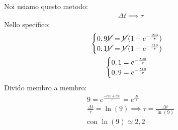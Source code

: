 \documentclass[a4paper, oneside]{article}
\begin{document}
Noi usiamo questo metodo:
\begin{gather*}
    \Delta t \implies \tau
\end{gather*}
Nello specifico:
\begin{gather*}
\begin{cases}
        0,9 \cancel{V} = \cancel{V} ( 1 - e^{-\frac{t 90}{\tau}})\\
        0,1 \cancel{V} = \cancel{V} ( 1 - e^{-\frac{t 10}{\tau}})
\end{cases}\\
\begin{cases}
    0,1 =  e ^{-\frac{t 90}{\tau}}\\
    0,9 = e^{-\frac{t 10}{\tau}}
\end{cases}
\end{gather*}
Divido membro a membro:
\begin{gather*}
    9 = e^{\frac{-t 10 + t90}{\tau}} = e^\frac{\Delta t}{\tau}\\
    \frac{\Delta t}{\tau} = \ln(9) \implies \tau = \frac{\Delta t}{\ln(9)}\\
    \text{con } \ln(9) \simeq 2,2
\end{gather*}
\end{document}
